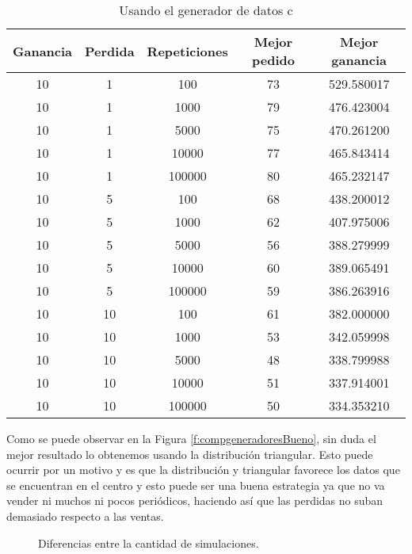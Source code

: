 \documentclass[12pt,a4paper]{article}
\begin{document}
\begin{table}[H]
	\begin{tabular}{ccccc} \toprule
		{Ganancia} & {Perdida} & {Repeticiones} & {Mejor pedido} & {Mejor ganancia} \\ \midrule
		10  & 1 & 100 & 73 & 529.580017 \\
		10  & 1 & 1000 & 79 & 476.423004
		 \\
		10  & 1 & 5000 & 75 & 470.261200 \\
		10  & 1 & 10000 & 77 & 465.843414 \\
		10  & 1 & 100000 & 80 & 465.232147 \\ \midrule
		
		10  & 5 & 100 & 68 & 438.200012 \\
		10  & 5 & 1000 & 62 & 407.975006 \\
		10  & 5 & 5000 & 56 & 388.279999 \\
		10  & 5 & 10000 & 60 & 389.065491 \\
		10  & 5 & 100000 & 59 & 386.263916		 \\ \midrule
		
		10  & 10 & 100 & 61 & 382.000000
		 \\
		10  & 10 & 1000 & 53 & 342.059998 \\
		10  & 10 & 5000 & 48 & 338.799988 \\
		10  & 10 & 10000 & 51 & 337.914001 \\
		10  & 10 & 100000 & 50 & 334.353210\\ \midrule	
	\end{tabular}
	\caption{Usando el generador de datos c} \label{tab:genDataC}
\end{table}
Como se puede observar en la Figura \ref{f:compgeneradoresBueno}, sin duda el mejor resultado lo obtenemos usando la distribución triangular. Esto puede ocurrir por un motivo y es que la distribución y triangular favorece los datos que se encuentran en el centro y esto puede ser una buena estrategia ya que no va vender ni muchos ni pocos periódicos, haciendo así que las perdidas no suban demasiado respecto a las ventas.

\begin{figure}[H]
	\centering
	\caption{Diferencias entre la cantidad de simulaciones.}
	\label{f:compgeneradores}
\end{figure}
\end{document}
